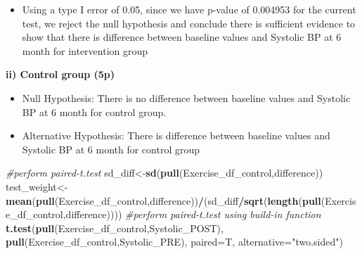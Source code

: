 \documentclass[]{article}
\newenvironment{Shaded}{\begin{snugshade}}{\end{snugshade}}
\newcommand{\CommentTok}[1]{\textcolor[rgb]{0.56,0.35,0.01}{\textit{#1}}}
\newcommand{\DataTypeTok}[1]{\textcolor[rgb]{0.13,0.29,0.53}{#1}}
\newcommand{\DecValTok}[1]{\textcolor[rgb]{0.00,0.00,0.81}{#1}}
\newcommand{\KeywordTok}[1]{\textcolor[rgb]{0.13,0.29,0.53}{\textbf{#1}}}
\newcommand{\NormalTok}[1]{#1}
\newcommand{\OperatorTok}[1]{\textcolor[rgb]{0.81,0.36,0.00}{\textbf{#1}}}
\newcommand{\StringTok}[1]{\textcolor[rgb]{0.31,0.60,0.02}{#1}}
\providecommand{\tightlist}{%
  \setlength{\itemsep}{0pt}\setlength{\parskip}{0pt}}
\begin{document}
\begin{itemize}
\tightlist
\item
  Using a type I error of 0.05, since we have p-value of 0.004953 for
  the current test, we reject the null hypothesis and conclude there is
  sufficient evidence to show that there is difference between baseline
  values and Systolic BP at 6 month for intervention group
\end{itemize}

\textbf{ii) Control group (5p)}

\begin{itemize}
\tightlist
\item
  Null Hypothesis: There is no difference between baseline values and
  Systolic BP at 6 month for control group.
\item
  Alternative Hypothesis: There is difference between baseline values
  and Systolic BP at 6 month for control group
\end{itemize}

\begin{Shaded}
\end{Shaded}

\begin{Shaded}
\begin{Highlighting}[]
\CommentTok{#perform paired-t.test }
\NormalTok{sd_diff<-}\KeywordTok{sd}\NormalTok{(}\KeywordTok{pull}\NormalTok{(Exercise_df_control,difference))}
\NormalTok{test_weight<-}\KeywordTok{mean}\NormalTok{(}\KeywordTok{pull}\NormalTok{(Exercise_df_control,difference))}\OperatorTok{/}\NormalTok{(sd_diff}\OperatorTok{/}\KeywordTok{sqrt}\NormalTok{(}\KeywordTok{length}\NormalTok{(}\KeywordTok{pull}\NormalTok{(Exercise_df_control,difference))))}
\CommentTok{#perform paired-t.test using build-in function}
\KeywordTok{t.test}\NormalTok{(}\KeywordTok{pull}\NormalTok{(Exercise_df_control,Systolic_POST), }\KeywordTok{pull}\NormalTok{(Exercise_df_control,Systolic_PRE), }\DataTypeTok{paired=}\NormalTok{T, }\DataTypeTok{alternative=}\StringTok{"two.sided"}\NormalTok{)}
\end{Highlighting}
\end{Shaded}
\end{document}
